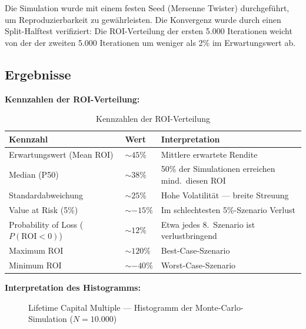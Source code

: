 \documentclass[11pt,a4paper]{article}
\begin{document}
Die Simulation wurde mit einem festen Seed (Mersenne Twister) durchgeführt, um Reproduzierbarkeit zu gewährleisten. Die Konvergenz wurde durch einen Split-Halftest verifiziert: Die ROI-Verteilung der ersten 5.000 Iterationen weicht von der der zweiten 5.000 Iterationen um weniger als 2\% im Erwartungswert ab.

\subsection{Ergebnisse}

\textbf{Kennzahlen der ROI-Verteilung:}

\begin{table}[H]
\centering
\begin{tabular}{llp{6.5cm}}
\toprule
\textbf{Kennzahl} & \textbf{Wert} & \textbf{Interpretation} \\
\midrule
Erwartungswert (Mean ROI)      & ${\sim}45\%$      & Mittlere erwartete Rendite \\
Median (P50)                   & ${\sim}38\%$      & 50\% der Simulationen erreichen mind.\ diesen ROI \\
Standardabweichung              & ${\sim}25\%$      & Hohe Volatilität — breite Streuung \\
Value at Risk (5\%)             & ${\sim}{-}15\%$   & Im schlechtesten 5\%-Szenario Verlust \\
Probability of Loss ($P(\text{ROI}<0)$) & ${\sim}12\%$ & Etwa jedes 8.\ Szenario ist verlustbringend \\
Maximum ROI                    & ${\sim}120\%$     & Best-Case-Szenario \\
Minimum ROI                    & ${\sim}{-}40\%$   & Worst-Case-Szenario \\
\bottomrule
\end{tabular}
\caption{Kennzahlen der ROI-Verteilung}
\end{table}

\textbf{Interpretation des Histogramms:}

\begin{figure}[H]
\centering
{}
\caption{Lifetime Capital Multiple — Histogramm der Monte-Carlo-Simulation ($N = 10.000$)}
\end{figure}
\end{document}
